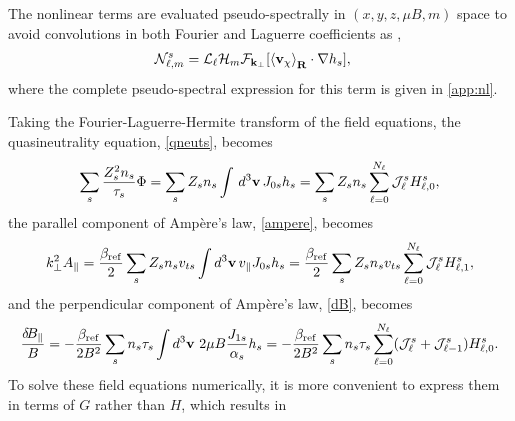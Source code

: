 \documentclass{jpp}
\renewcommand{\vec}[1]{\ensuremath{\mbox{$ {\bf #1} $}}} %
\begin{document}
The nonlinear terms are evaluated pseudo-spectrally in $(x,y,z,\mu B, m)$ space to avoid convolutions in both Fourier and Laguerre coefficients as \citep{Mandell2018},
\begin{align}
    \mathcal{N}_{\ell,m}^s &= \mathcal{L}_\ell \mathcal{H}_m \mathcal{F}_{\bf k_\perp} [\langle{  {\bf v}_{\chi} \rangle}_{\bf R}\cdot\nabla {\color{black} h_s}],
\end{align}
where the complete pseudo-spectral expression for this term is given in \cref{app:nl}.


Taking the Fourier-Laguerre-Hermite transform of the field equations, the quasineutrality equation, \cref{qneuts}, becomes
\begin{align}
    \sum_s \frac{Z_s^2 n_s}{\tau_s}\Phi =  \sum_s Z_s n_s \int\,d^3{\bf v}\, J_{0s} h_s = \sum_s Z_s n_s \sum_{\ell=0}^{\color{black} N_\ell} \mathcal{J}_\ell^s H_{\ell,0}^s,
\end{align}
the parallel component of Amp\`ere's law, \cref{ampere}, becomes
\begin{align}
    k_\perp^2 A_\parallel =  \frac{\beta_\mathrm{ref}}{2}\sum_s Z_s n_s v_{ts} \int d^3{\bf v}\, v_\parallel J_{0s} h_s= \frac{\beta_\mathrm{ref}}{2}\sum_s Z_s n_s v_{ts} \sum_{\ell=0}^{\color{black} N_\ell} \mathcal{J}_\ell^s H^s_{\ell, 1},
\end{align}
and the perpendicular component of Amp\`ere's law, \cref{dB}, becomes
\begin{align}
    {\color{black} \frac{\delta\! B_\parallel}{B}}=  -\frac{\beta_\mathrm{ref}}{2{\color{black} B^2}}\sum_s n_s \tau_s \int d^3\vec{v}\ 2\mu B \frac{J_{1s}}{\alpha_s} h_s = -\frac{\beta_\mathrm{ref}}{2{\color{black} B^2}}\sum_s n_s\tau_s \sum_{\ell=0}^{\color{black} N_\ell} (\mathcal{J}^s_\ell+\mathcal{J}^s_{\ell-1}) H^s_{\ell, 0}.
\end{align}
To solve these field equations numerically, it is more convenient to express them in terms of $G$ rather than $H$, which results in
\end{document}
